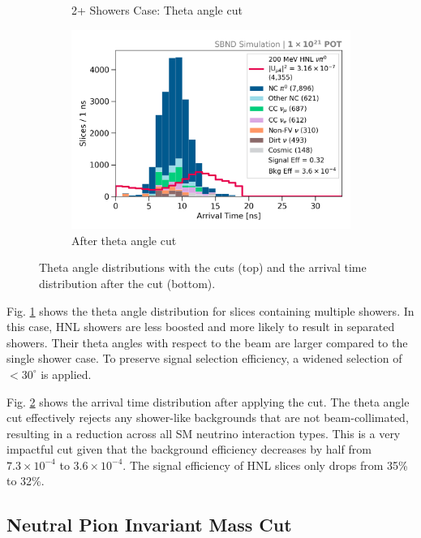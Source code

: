\begin{figure}[bp!]
\begin{subfigure}[b]{0.495\textwidth}
            \caption{2+ Showers Case: Theta angle cut}%
	    \label{fig:2shw_theta_cut}
        \end{subfigure}
        \hfill
	\centering
        \begin{subfigure}[b]{0.495\textwidth}   
            \centering 
            \includegraphics[width=\textwidth]{beam_bucket_postshowertheta}
            \caption{After theta angle cut}%
	    \label{fig:bb_theta}
        \end{subfigure}
	\caption[Theta Angle Cut]{
		Theta angle distributions with the cuts (top) and the arrival time distribution after the cut (bottom). 
	}
        \label{fig:theta_cut}
\end{figure}

Fig. \ref{fig:2shw_theta_cut} shows the theta angle distribution for slices containing multiple showers.
In this case, HNL showers are less boosted and more likely to result in separated showers.
Their theta angles with respect to the beam are larger compared to the single shower case.
To preserve signal selection efficiency, a widened selection of $< 30^{\circ}$ is applied.

Fig. \ref{fig:bb_theta} shows the arrival time distribution after applying the cut.
The theta angle cut effectively rejects any shower-like backgrounds that are not beam-collimated, resulting in a reduction across all SM neutrino interaction types.
This is a very impactful cut given that the background efficiency decreases by half from $7.3 \times 10^{-4}$ to $3.6 \times 10^{-4}$.
The signal efficiency of HNL slices only drops from 35\% to 32\%.

\subsection{Neutral Pion Invariant Mass Cut}
\label{sec:mass_cut}

